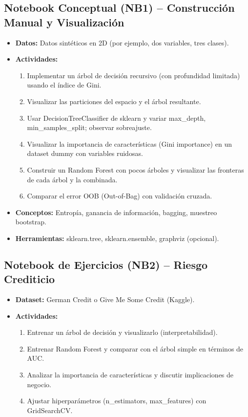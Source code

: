 \documentclass[12pt,a4paper]{article}
\begin{document}
\subsection*{Notebook Conceptual (NB1) – Construcción Manual y Visualización}
\begin{itemize}
    \item \textbf{Datos:} Datos sintéticos en 2D (por ejemplo, dos variables, tres clases).
    \item \textbf{Actividades:}
    \begin{enumerate}
        \item Implementar un árbol de decisión recursivo (con profundidad limitada) usando el índice de Gini.
        \item Visualizar las particiones del espacio y el árbol resultante.
        \item Usar DecisionTreeClassifier de sklearn y variar max\_depth, min\_samples\_split; observar sobreajuste.
        \item Visualizar la importancia de características (Gini importance) en un dataset dummy con variables ruidosas.
        \item Construir un Random Forest con pocos árboles y visualizar las fronteras de cada árbol y la combinada.
        \item Comparar el error OOB (Out-of-Bag) con validación cruzada.
    \end{enumerate}
    \item \textbf{Conceptos:} Entropía, ganancia de información, bagging, muestreo bootstrap.
    \item \textbf{Herramientas:} sklearn.tree, sklearn.ensemble, graphviz (opcional).
\end{itemize}

\subsection*{Notebook de Ejercicios (NB2) – Riesgo Crediticio}
\begin{itemize}
    \item \textbf{Dataset:} German Credit o Give Me Some Credit (Kaggle).
    \item \textbf{Actividades:}
    \begin{enumerate}
        \item Entrenar un árbol de decisión y visualizarlo (interpretabilidad).
        \item Entrenar Random Forest y comparar con el árbol simple en términos de AUC.
        \item Analizar la importancia de características y discutir implicaciones de negocio.
        \item Ajustar hiperparámetros (n\_estimators, max\_features) con GridSearchCV.
    \end{enumerate}
\end{itemize}
\end{document}
